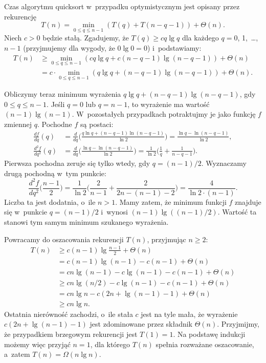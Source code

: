 \exercise %
Czas algorytmu quicksort w~przypadku optymistycznym jest opisany przez rekurencję
\[
    T(n) = \min_{0\le q\le n-1}(T(q)+T(n-q-1))+\Theta(n).
\]
Niech $c>0$ będzie stałą. Zgadujemy, że $T(q)\ge cq\lg q$ dla każdego $q=0$, 1,~\dots,~$n-1$ (przyjmujemy dla wygody, że $0\lg0=0$) i~podstawiamy:
\begin{align*}
    T(n) &\ge \min_{0\le q\le n-1}(cq\lg q+c(n-q-1)\lg(n-q-1))+\Theta(n) \\
	&= c\cdot\!\!\!\min_{0\le q\le n-1}(q\lg q+(n-q-1)\lg(n-q-1))+\Theta(n).
\end{align*}

Obliczymy teraz minimum wyrażenia $q\lg q+(n-q-1)\lg(n-q-1)$, gdy $0\le q\le n-1$. Jeśli $q=0$ lub $q=n-1$, to wyrażenie ma wartość $(n-1)\lg(n-1)$. W~pozostałych przypadkach potraktujmy je jako funkcję $f$ zmiennej $q$. Pochodne $f$ są postaci:
\begin{align*}
    \frac{df}{dq}(q) &= \frac{d}{dq}\biggl(\frac{q\ln q+(n-q-1)\ln(n-q-1)}{\ln2}\biggr) = \frac{\ln q-\ln(n-q-1)}{\ln2}, \\[1mm]
	\frac{d^2\!f}{dq^2}(q) &= \frac{d}{dq}\biggl(\frac{\ln q-\ln(n-q-1)}{\ln2}\biggr) = \frac{1}{\ln2}\biggl(\frac{1}{q}+\frac{1}{n-q-1}\biggr).
\end{align*}
Pierwsza pochodna zeruje się tylko wtedy, gdy $q=(n-1)/2$. Wyznaczamy drugą pochodną w~tym punkcie:
\[
    \frac{d^2\!f}{dq^2}\biggl(\frac{n-1}{2}\biggr) = \frac{1}{\ln2}\biggl(\frac{2}{n-1}+\frac{2}{2n-(n-1)-2}\biggr) = \frac{4}{\ln2\cdot(n-1)}.
\]
Liczba ta jest dodatnia, o~ile $n>1$. Mamy zatem, że minimum funkcji $f$ znajduje się w~punkcie $q=(n-1)/2$ i~wynosi $(n-1)\lg((n-1)/2)$. Wartość ta stanowi tym samym minimum szukanego wyrażenia.

Powracamy do oszacowania rekurencji $T(n)$, przyjmując $n\ge2$:
\begin{align*}
    T(n) &\ge c(n-1)\lg\frac{n-1}{2}+\Theta(n) \\
	&= c(n-1)\lg(n-1)-c(n-1)+\Theta(n) \\
	&= cn\lg(n-1)-c\lg(n-1)-c(n-1)+\Theta(n) \\
	&\ge cn\lg(n/2)-c\lg(n-1)-c(n-1)+\Theta(n) \\
	&= cn\lg n-c(2n+\lg(n-1)-1)+\Theta(n) \\
	&\ge cn\lg n.
\end{align*}
Ostatnia nierówność zachodzi, o~ile stała $c$ jest na tyle mała, że wyrażenie $c(2n+\lg(n-1)-1)$ jest zdominowane przez składnik $\Theta(n)$. Przyjmijmy, że przypadkiem brzegowym rekurencji jest $T(1)=1$. Na podstawę indukcji możemy więc przyjąć $n=1$, dla którego $T(n)$ spełnia rozważane oszacowanie, a~zatem $T(n)=\Omega(n\lg n)$.

